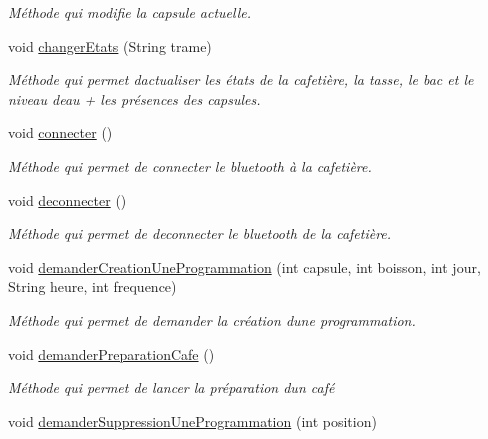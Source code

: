 \begin{DoxyCompactItemize}
\begin{DoxyCompactList}\small\item\em Méthode qui modifie la capsule actuelle. \end{DoxyCompactList}\item 
void \hyperlink{classcom_1_1example_1_1ekawa_1_1_cafetiere_aba42bba06ffbf08735d7f548bcce9f42}{changer\+Etats} (String trame)
\begin{DoxyCompactList}\small\item\em Méthode qui permet d\textquotesingle{}actualiser les états de la cafetière, la tasse, le bac et le niveau d\textquotesingle{}eau + les présences des capsules. \end{DoxyCompactList}\item 
void \hyperlink{classcom_1_1example_1_1ekawa_1_1_cafetiere_a7ea38fe01cdeb8588fc34de028907a9c}{connecter} ()
\begin{DoxyCompactList}\small\item\em Méthode qui permet de connecter le bluetooth à la cafetière. \end{DoxyCompactList}\item 
void \hyperlink{classcom_1_1example_1_1ekawa_1_1_cafetiere_a8bf7e4352dafd60485555ee68edb9e52}{deconnecter} ()
\begin{DoxyCompactList}\small\item\em Méthode qui permet de deconnecter le bluetooth de la cafetière. \end{DoxyCompactList}\item 
void \hyperlink{classcom_1_1example_1_1ekawa_1_1_cafetiere_a2657310905f93ef4fba5b5f1dad81be9}{demander\+Creation\+Une\+Programmation} (int capsule, int boisson, int jour, String heure, int frequence)
\begin{DoxyCompactList}\small\item\em Méthode qui permet de demander la création d\textquotesingle{}une programmation. \end{DoxyCompactList}\item 
void \hyperlink{classcom_1_1example_1_1ekawa_1_1_cafetiere_a76eb3aa494815ac3b43371e21de21db3}{demander\+Preparation\+Cafe} ()
\begin{DoxyCompactList}\small\item\em Méthode qui permet de lancer la préparation d\textquotesingle{}un café \end{DoxyCompactList}\item 
void \hyperlink{classcom_1_1example_1_1ekawa_1_1_cafetiere_a0af9bf8f80c745c7919ea3efdc2183d0}{demander\+Suppression\+Une\+Programmation} (int position)

\end{DoxyCompactItemize}
